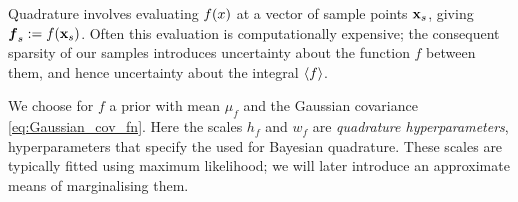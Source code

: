 \documentclass{article}
\begin{document}
Quadrature involves evaluating $f(\lfv)$ at a vector of sample points $\vlfv_s$, giving $\vf\pha_s\deq f(\vlfv_s)$. Often this evaluation is computationally expensive; the consequent sparsity of our samples introduces uncertainty about the function $f$ between them, and hence uncertainty about the integral $\inty{f}$.



We choose for $f$ a \gpb prior with mean $\mu_f$ and the Gaussian covariance \eqref{eq:Gaussian_cov_fn}. Here the scales $h_f$ and $w_f$ are \emph{quadrature hyperparameters}, hyperparameters that specify the  \gpb used for Bayesian quadrature. These scales are typically fitted using maximum likelihood; we will later introduce an approximate means of marginalising them.

\end{document}
